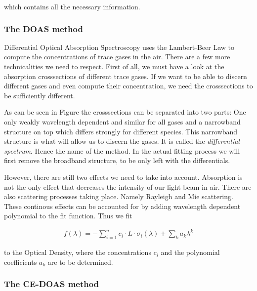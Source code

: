 which contains all the necessary information.

\subsubsection{The DOAS method}
\label{sec:doas}


Differential Optical Absorption Spectroscopy uses the Lambert-Beer Law
to compute the concentrations of trace gases in the air. There are a
few more technicalities we need to respect. First of all, we must have
a look at the absorption crosssections of different trace gases. If we
want to be able to discern different gases and even compute their
concentration, we need the crosssections to be sufficiently
different.

As can be seen in Figure  the
crosssections can be separated into two parts: One only weakly
wavelength dependent and similar for all gases and a narrowband
structure on top which differs strongly for different species. This
narrowband structure is what will allow us to discern the gases. It is
called the \emph{differential spectrum}. Hence the name of the
method. In the actual fitting process we will first remove the
broadband structure, to be only left with the differentials.

However, there are still two effects we need to take into
account. Absorption is not the only effect that decreases the
intensity of our light beam in air. There are also scattering
processes taking place. Namely Rayleigh and Mie scattering. These
continous effects can be accounted for by adding wavelength dependent
polynomial to the fit function. Thus we fit

\begin{align*}
  f(\lambda) = - \sum_{i=1}^n c_i \cdot L \cdot \sigma_i(\lambda) +
  \sum_k a_k \lambda^k
\end{align*}

to the Optical Density, where the concentrations $c_i$ and the polynomial
coefficients $a_k$ are to be determined.


\subsubsection{The CE-DOAS method}
\label{sec:ce-doas}

